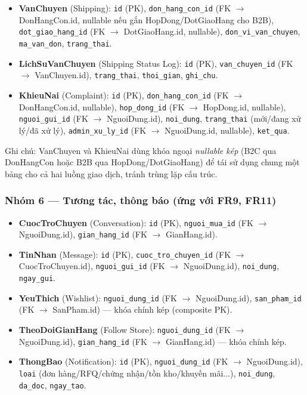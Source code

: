 \begin{itemize}
    \item \textbf{VanChuyen} (Shipping): \texttt{id} (PK),
    \texttt{don\_hang\_con\_id} (FK $\to$ DonHangCon.id, nullable nếu gắn
    HopDong/DotGiaoHang cho B2B), \texttt{dot\_giao\_hang\_id}
    (FK $\to$ DotGiaoHang.id, nullable), \texttt{don\_vi\_van\_chuyen},
    \texttt{ma\_van\_don}, \texttt{trang\_thai}.
    \item \textbf{LichSuVanChuyen} (Shipping Status Log): \texttt{id} (PK),
    \texttt{van\_chuyen\_id} (FK $\to$ VanChuyen.id), \texttt{trang\_thai},
    \texttt{thoi\_gian}, \texttt{ghi\_chu}.
    \item \textbf{KhieuNai} (Complaint): \texttt{id} (PK),
    \texttt{don\_hang\_con\_id} (FK $\to$ DonHangCon.id, nullable),
    \texttt{hop\_dong\_id} (FK $\to$ HopDong.id, nullable),
    \texttt{nguoi\_gui\_id} (FK $\to$ NguoiDung.id), \texttt{noi\_dung},
    \texttt{trang\_thai} (mới/đang xử lý/đã xử lý), \texttt{admin\_xu\_ly\_id}
    (FK $\to$ NguoiDung.id, nullable), \texttt{ket\_qua}.
\end{itemize}
Ghi chú: VanChuyen và KhieuNai dùng khóa ngoại \emph{nullable kép} (B2C qua
DonHangCon hoặc B2B qua HopDong/DotGiaoHang) để tái sử dụng chung một bảng
cho cả hai luồng giao dịch, tránh trùng lặp cấu trúc.
 
\subsubsection*{Nhóm 6 --- Tương tác, thông báo (ứng với FR9, FR11)}
 
\begin{itemize}
    \item \textbf{CuocTroChuyen} (Conversation): \texttt{id} (PK),
    \texttt{nguoi\_mua\_id} (FK $\to$ NguoiDung.id), \texttt{gian\_hang\_id}
    (FK $\to$ GianHang.id).
    \item \textbf{TinNhan} (Message): \texttt{id} (PK),
    \texttt{cuoc\_tro\_chuyen\_id} (FK $\to$ CuocTroChuyen.id),
    \texttt{nguoi\_gui\_id} (FK $\to$ NguoiDung.id), \texttt{noi\_dung},
    \texttt{ngay\_gui}.
    \item \textbf{YeuThich} (Wishlist): \texttt{nguoi\_dung\_id}
    (FK $\to$ NguoiDung.id), \texttt{san\_pham\_id} (FK $\to$ SanPham.id) ---
    khóa chính kép (composite PK).
    \item \textbf{TheoDoiGianHang} (Follow Store): \texttt{nguoi\_dung\_id}
    (FK $\to$ NguoiDung.id), \texttt{gian\_hang\_id} (FK $\to$ GianHang.id)
    --- khóa chính kép.
    \item \textbf{ThongBao} (Notification): \texttt{id} (PK),
    \texttt{nguoi\_dung\_id} (FK $\to$ NguoiDung.id), \texttt{loai} (đơn
    hàng/RFQ/chứng nhận/tồn kho/khuyến mãi...), \texttt{noi\_dung},
    \texttt{da\_doc}, \texttt{ngay\_tao}.
\end{itemize}
 
